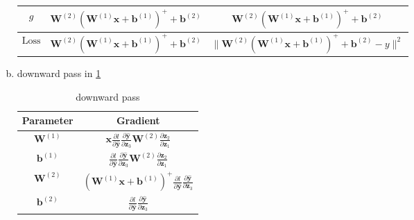 \documentclass[10pt,a4paper]{article}
\theoremstyle{dotlessP}
\newcommand{\loss}{\text{Loss}}
\newcommand{\dldy}{\frac{\partial l}{\partial \bm{\hat{y}}}}
\newcommand{\dydz}{\frac{\partial \bm{\hat{y}}}{\partial \bm z_3}}
\begin{document}
\begin{enumerate}[(a)]
\begin{table}[tbhp]
{\begin{center}
\begin{tabular}{|c|c|c|}
				\hline 
			$g$	& $\bm W^{(2)}\left(\bm W^{(1)} \bm x+\bm b^{(1)}\right)^+ + \bm b^{(2)}$ &  $\bm W^{(2)}\left(\bm W^{(1)} \bm x+\bm b^{(1)}\right)^+ + \bm b^{(2)}$\\ 
				\hline 
			$\loss$	& $\bm W^{(2)}\left(\bm W^{(1)} \bm x+\bm b^{(1)}\right)^+ + \bm b^{(2)}$ & $\|\bm W^{(2)}\left(\bm W^{(1)} \bm x+\bm b^{(1)}\right)^+ + \bm b^{(2)}-y\|^2$ \\ 
				\hline 
			\end{tabular} 
			\end{center}
		}
	\end{table}

\item downward pass in \cref{tab:dw}
	\begin{table}[tbhp] 
	{\footnotesize
		\caption{ downward pass
		}\label{tab:dw}
		\begin{center}
			\renewcommand{\arraystretch}{1.8}
	\begin{tabular}{|c|c|}
		\hline 
	Parameter	&  Gradient \\ 
		\hline 
	$\bm W^{(1)}$	& $\bm x\dldy\dydz\bm W^{(2)} \frac{\partial \bm z_2}{\partial \bm z_1}$ \\ 
		\hline 
		$\bm b^{(1)}$&  $\dldy \dydz\bm W^{(2)} \frac{\partial \bm z_2}{\partial \bm z_1}$\\ 
		\hline 
		$\bm W^{(2)}$&  $\left(\bm W^{(1)} \bm x+\bm b^{(1)}\right)^+ \dldy\dydz$\\ 
		\hline 
		$\bm b^{(2)}$& $\dldy\dydz$ \\ 
		\hline 
	\end{tabular} 
		\end{center}
	}
\end{table}


\end{enumerate}
\end{document}
